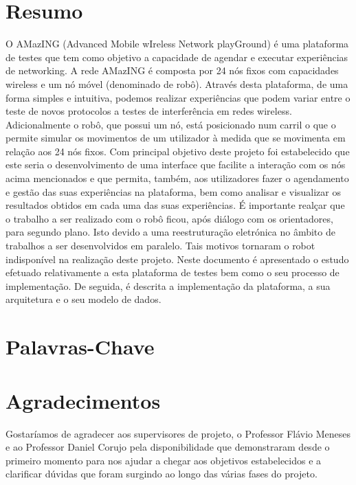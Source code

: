 \chapter{Resumo}
O AMazING  (Advanced Mobile wIreless Network playGround) é uma plataforma de testes que tem como objetivo a capacidade de agendar e executar experiências de networking. A rede AMazING é composta por 24 nós fixos com capacidades wireless e um nó móvel (denominado de robô).\newline
Através desta plataforma, de uma forma simples e intuitiva, podemos realizar experiências que podem variar entre o teste de novos protocolos a testes de interferência em redes wireless. Adicionalmente o robô, que possui um nó, está posicionado num carril o que o permite simular os movimentos de um utilizador à medida que se  movimenta em relação aos 24 nós fixos.\newline
Com principal objetivo deste projeto foi estabelecido que este seria o desenvolvimento de uma interface que facilite a interação com os nós acima mencionados e que permita, também, aos utilizadores fazer o agendamento e gestão das suas experiências na plataforma, bem como analisar e visualizar os resultados obtidos em cada uma das suas experiências. É importante realçar que o trabalho a ser realizado com o robô ficou, após diálogo com os orientadores, para segundo plano. Isto devido a uma reestruturação eletrónica no âmbito de trabalhos a ser desenvolvidos em paralelo. Tais motivos tornaram o robot indisponível na realização deste projeto.\newline
Neste documento é apresentado o estudo efetuado relativamente a esta plataforma de testes bem como o seu processo de implementação. De seguida, é descrita a implementação da plataforma, a sua arquitetura e o seu modelo de dados.

\chapter{Palavras-Chave}
\begin{acronym}[Keys]
\end{acronym}

\chapter{Agradecimentos}
Gostaríamos de agradecer aos supervisores de projeto, o Professor Flávio Meneses e ao Professor Daniel Corujo pela disponibilidade que demonstraram desde o primeiro momento para nos  ajudar a chegar aos objetivos estabelecidos e a clarificar dúvidas que foram surgindo ao longo das várias fases do projeto.
